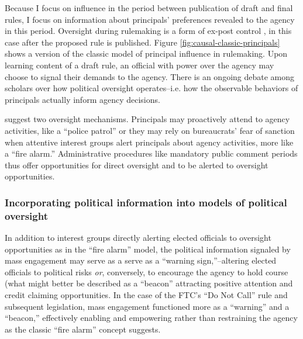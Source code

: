 
Because I focus on influence in the period between publication of draft and final rules, I focus on information about principals' preferences revealed to the agency in this period. Oversight during rulemaking is a form of ex-post control \citep{Epstein1994}, in this case after the proposed rule is published. Figure \ref{fig:causal-classic-principals} shows a version of the classic model of principal influence in rulemaking. Upon learning content of a draft rule, an official with power over the agency may choose to signal their demands to the agency. There is an ongoing debate among scholars over how political oversight operates--i.e. how the observable behaviors of principals actually inform agency decisions. 



\citet{McCubbins1987} suggest two oversight mechanisms. Principals may proactively attend to agency activities, like a ``police patrol'' or they may rely on bureaucrats' fear of sanction when attentive interest groups alert principals about agency activities, more like a ``fire alarm.'' Administrative procedures like mandatory public comment periods thus offer opportunities for direct oversight and to be alerted to oversight opportunities.


\subsubsection{Incorporating political information into models of political oversight}
In addition to interest groups directly alerting elected officials to oversight opportunities as in the ``fire alarm'' model,
the political information signaled by mass engagement may serve as a serve as a ``warning sign,''--altering elected officials to political risks
\emph{or}, conversely, to encourage the agency to hold course (what might better be described as a ``beacon'' attracting positive attention and credit claiming opportunities. In the case of the FTC's ``Do Not Call'' rule and subsequent legislation, mass engagement functioned more as a ``warning'' and a ``beacon,'' effectively enabling and empowering rather than restraining the agency as the classic ``fire alarm'' concept suggests.

